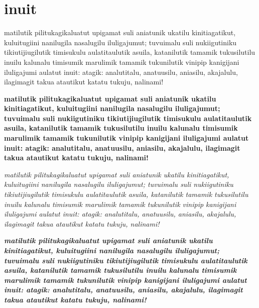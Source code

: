 \documentclass[11pt]{article}
\begin{document}
\InuitToday
\inuittext
\section{inuit}
matilutik pilitukagikaluatut upigamat suli aniatunik
ukatilu kinitiagatikut, kuluitugiini nanilugila nasalugilu
iluligajumut; tuvuimalu suli nukiigutiniku tikiutijiugilutik
timisukulu aulatitaulutik asuila, katanilutik tamamik tukusilutilu
inuilu kalunalu timisumik marulimik tamamik tukunilutik vinipip
kanigijani iluligajumi aulatut inuit: atagik: analutitalu,
anatuusilu, aniasilu, akajalulu, ilagimagit takua atautikut
katatu tukuju, {nalinami!} 
\vspace*{1cm}

\textbf{
matilutik pilitukagikaluatut upigamat suli aniatunik
ukatilu kinitiagatikut, kuluitugiini nanilugila nasalugilu
iluligajumut; tuvuimalu suli nukiigutiniku tikiutijiugilutik
timisukulu aulatitaulutik asuila, katanilutik tamamik tukusilutilu
inuilu kalunalu timisumik marulimik tamamik tukunilutik vinipip
kanigijani iluligajumi aulatut inuit: atagik: analutitalu,
anatuusilu, aniasilu, akajalulu, ilagimagit takua atautikut
katatu tukuju, nalinami! }
\vspace*{1cm}

\textit{
matilutik pilitukagikaluatut upigamat suli aniatunik
ukatilu kinitiagatikut, kuluitugiini nanilugila nasalugilu
iluligajumut; tuvuimalu suli nukiigutiniku tikiutijiugilutik
timisukulu aulatitaulutik asuila, katanilutik tamamik tukusilutilu
inuilu kalunalu timisumik marulimik tamamik tukunilutik vinipip
kanigijani iluligajumi aulatut inuit: atagik: analutitalu,
anatuusilu, aniasilu, akajalulu, ilagimagit takua atautikut
katatu tukuju, nalinami! }
\vspace*{1cm}

\textit{\textbf{
matilutik pilitukagikaluatut upigamat suli aniatunik
ukatilu kinitiagatikut, kuluitugiini nanilugila nasalugilu
iluligajumut; tuvuimalu suli nukiigutiniku tikiutijiugilutik
timisukulu aulatitaulutik asuila, katanilutik tamamik tukusilutilu
inuilu kalunalu timisumik marulimik tamamik tukunilutik vinipip
kanigijani iluligajumi aulatut inuit: atagik: analutitalu,
anatuusilu, aniasilu, akajalulu, ilagimagit takua atautikut
katatu tukuju, nalinami! }}
\newpage
\begin{center}
\end{center}
\end{document}
